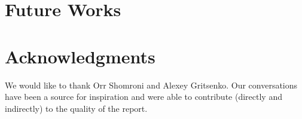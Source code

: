 \documentclass{acm_proc_article-sp}
\begin{document}
\section{Future Works} \label{sec:future}

%

\section{Acknowledgments} \label{sec:ack}
We would like to thank Orr Shomroni and Alexey Gritsenko. Our conversations have been a source for inspiration
and were able to contribute (directly and indirectly) to the quality of the report.



\end{document}
